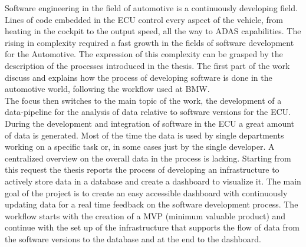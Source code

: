 \documentclass[../main.tex]{subfiles}
\begin{document}
Software engineering in the field of automotive is a continuously developing field. Lines of code embedded in the \gls{ECU} control every aspect of the vehicle, from heating in the cockpit to the output speed, all the way to \gls{ADAS} capabilities. The rising in complexity required a fast growth in the fields of software development for the Automotive. The expression of this complexity can be grasped by the description of the processes introduced in the thesis. The first part of the work discuss and explains how the process of developing software is done in the automotive world, following the workflow used at \gls{BMW}.\\
The focus then switches to the main topic of the work, the development of a data-pipeline for the analysis of data relative to software versions for the \gls{ECU}. During the development and integration of software in the \gls{ECU} a great amount of data is generated. Most of the time the data is used by single departments working on a specific task or, in some cases just by the single developer. A centralized overview on the overall data in the process is lacking. Starting from this request the thesis reports the process of developing an infrastructure to actively store data in a database and create a dashboard to visualize it. The main goal of the project is to create an easy accessible dashboard with continuously updating data for a real time feedback on the software development process. The workflow starts with the creation of a MVP (minimum valuable product) and continue with the set up of the infrastructure that supports the flow of data from the software versions to the database and at the end to the dashboard.\\
\cleardoublepage
\end{document}
